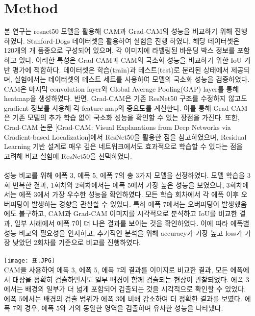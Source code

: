 \documentclass[twocolumn]{article}
\begin{document}
\section{Method}
본 연구는 resnet50 모델을 활용해 CAM과 Grad-CAM의 성능을 비교하기 위해 진행하였다.
Stanford-Dogs 데이터셋을 활용하여 실험을 진행 하였다. 해당 데이터셋은 120개의 개 품종으로 구성되어 있으며, 각 이미지에 라벨링된 바운딩 박스 정보를 포함하고 있다.
이러한 특성은 Grad-CAM과 CAM의 국소화 성능을 비교하기 위한 IoU 기반 평가에 적합하다.
데이터셋은 학습(train)과 테스트(test)로 분리된 상태에서 제공되며, 실험에서는 데이터셋의 테스트 세트를 사용하여 모델의 국소화 성능을 검증하였다.
CAM은 마지막 convolution layer와 Global Average Pooling(GAP) layer를 통해 heatmap을 생성하였다.
반면, Grad-CAM은 기존 ResNet50 구조를 수정하지 않고도 gradient 정보를 사용해 각 feature map의 중요도를 계산한다.
이를 통해 Grad-CAM은 기존 모델의 추가 학습 없이 국소화 성능을 확인할 수 있는 장점을 가진다.
또한, Grad-CAM 논문 [Grad-CAM: Visual Explanations from Deep Networks via Gradient-based Localization]에서 ResNet50을 활용한 점을 참고하였으며, Residual Learning 기반 설계로 매우 깊은 네트워크에서도 효과적으로 학습할 수 있다는 점을 고려해 비교 실험에 ResNet50을 선택하였다.\\
\\
성능 비교를 위해 에폭 3, 에폭 5, 에폭 7의 총 3가지 모델을 선정하였다.
모델 학습을 3회 반복한 결과, 1회차와 2회차에서는 에폭 5에서 가장 높은 성능을 보였으나, 3회차에서는 에폭 3에서 가장 우수한 성능을 확인하였다.
모든 학습 회차에서 각 에폭 이후 오버피팅이 발생하는 경향을 관찰할 수 있었다.
특히 에폭 7에서는 오버피팅이 발생했음에도 불구하고, CAM과 Grad-CAM 이미지를 시각적으로 분석하고 IoU를 비교한 결과, 일부 사례에서 에폭 7이 더 나은 결과를 보이는 것을 확인하였다.
이에 따라 에폭별 성능 비교의 필요성을 인지하고, 추가적인 분석을 위해 accuracy가 가장 높고 loss가 가장 낮았던 2회차를 기준으로 비교를 진행하였다.\\
\\
\texttt{[image: 표.JPG]}\\

CAM을 사용하여 에폭 3, 에폭 5, 에폭 7의 결과를 이미지로 비교한 결과, 모든 에폭에서 대상을 정확히 검출하면서도 일부 배경이 함께 검출되는 현상이 관찰되었다.
에폭 3에서는 배경의 일부가 더 넓게 포함되어 검출되는 것을 시각적으로 확인할 수 있었다.
에폭 5에서는 배경의 검출 범위가 에폭 3에 비해 감소하여 더 정확한 결과를 보였다.
에폭 7의 경우, 에폭 5와 거의 동일한 영역을 검출하며 유사한 성능을 나타냈다.\\
\end{document}
